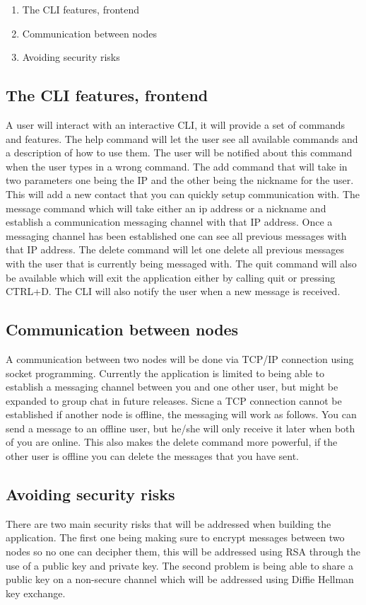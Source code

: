 \documentclass[twoside]{article}
\begin{document}
\begin{multicols}{2}
\begin{enumerate}
  \item The CLI features, frontend
  \item Communication between nodes 
  \item Avoiding security risks 
\end{enumerate}


\subsection{The CLI features, frontend}
A user will interact with an interactive CLI, it will provide a set of commands and features. The help command will let the user see all available commands and a description of how to use them. The user 
will be notified about this command when the user types in a wrong command. The add command that will take in two parameters one being the IP and the other 
being the nickname for the user. This will add a new contact that you can quickly setup communication with. The message command which will take either an ip address or a nickname and establish a communication messaging channel with that IP address. Once a messaging channel has been established one can see all previous messages with that IP address. The delete command will let one delete all previous messages with the user that is currently being messaged with. The quit command will also be available which will exit the application either 
by calling quit or pressing CTRL+D. The CLI will also notify the user when a new message is received.
\subsection{Communication between nodes }
A communication between two nodes will be done via TCP/IP connection using socket programming. Currently the application is limited to being able to establish a messaging channel between you and one other user, but might be expanded to group chat in future releases. Sicne a TCP connection cannot be established if another node is offline, the messaging will work as follows. You can send a message to an offline user, but he/she will only receive it later when both of you are online. This also makes the delete command more powerful, if the other user is offline you can delete the messages that you have sent.
\subsection{Avoiding security risks}
There are two main security risks that will be addressed when building the application. The first one being making sure to encrypt messages between two nodes so no one can decipher them, this will be addressed using RSA through the use of a public key and private key. The second problem is being able to share a public key on a non-secure channel which will be addressed using Diffie Hellman key exchange.

\end{multicols}
\end{document}
